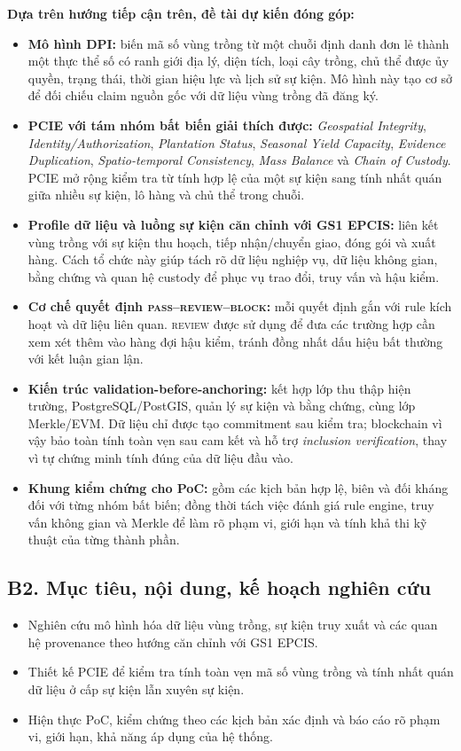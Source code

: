\documentclass[letterpaper,11pt]{article}
\begin{document}
\textbf{Dựa trên hướng tiếp cận trên, đề tài dự kiến đóng góp:}
\begin{itemize}
  \item \textbf{Mô hình DPI:} biến mã số vùng trồng từ một chuỗi định danh đơn lẻ thành một thực thể số có ranh giới địa lý, diện tích, loại cây trồng, chủ thể được ủy quyền, trạng thái, thời gian hiệu lực và lịch sử sự kiện. Mô hình này tạo cơ sở để đối chiếu claim nguồn gốc với dữ liệu vùng trồng đã đăng ký.
  \item \textbf{PCIE với tám nhóm bất biến giải thích được:} \textit{Geospatial Integrity}, \textit{Identity/Authorization}, \textit{Plantation Status}, \textit{Seasonal Yield Capacity}, \textit{Evidence Duplication}, \textit{Spatio-temporal Consistency}, \textit{Mass Balance} và \textit{Chain of Custody}. PCIE mở rộng kiểm tra từ tính hợp lệ của một sự kiện sang tính nhất quán giữa nhiều sự kiện, lô hàng và chủ thể trong chuỗi.
  \item \textbf{Profile dữ liệu và luồng sự kiện căn chỉnh với GS1 EPCIS:} liên kết vùng trồng với sự kiện thu hoạch, tiếp nhận/chuyển giao, đóng gói và xuất hàng. Cách tổ chức này giúp tách rõ dữ liệu nghiệp vụ, dữ liệu không gian, bằng chứng và quan hệ custody để phục vụ trao đổi, truy vấn và hậu kiểm.
  \item \textbf{Cơ chế quyết định \textsc{pass}--\textsc{review}--\textsc{block}:} mỗi quyết định gắn với rule kích hoạt và dữ liệu liên quan. \textsc{review} được sử dụng để đưa các trường hợp cần xem xét thêm vào hàng đợi hậu kiểm, tránh đồng nhất dấu hiệu bất thường với kết luận gian lận.
  \item \textbf{Kiến trúc validation-before-anchoring:} kết hợp lớp thu thập hiện trường, PostgreSQL/PostGIS, quản lý sự kiện và bằng chứng, cùng lớp Merkle/EVM. Dữ liệu chỉ được tạo commitment sau kiểm tra; blockchain vì vậy bảo toàn tính toàn vẹn sau cam kết và hỗ trợ \textit{inclusion verification}, thay vì tự chứng minh tính đúng của dữ liệu đầu vào.
  \item \textbf{Khung kiểm chứng cho PoC:} gồm các kịch bản hợp lệ, biên và đối kháng đối với từng nhóm bất biến; đồng thời tách việc đánh giá rule engine, truy vấn không gian và Merkle để làm rõ phạm vi, giới hạn và tính khả thi kỹ thuật của từng thành phần.
\end{itemize}

\subsection*{B2. Mục tiêu, nội dung, kế hoạch nghiên cứu}
\begin{itemize}
  \item Nghiên cứu mô hình hóa dữ liệu vùng trồng, sự kiện truy xuất và các quan hệ provenance theo hướng căn chỉnh với GS1 EPCIS.
  \item Thiết kế PCIE để kiểm tra tính toàn vẹn mã số vùng trồng và tính nhất quán dữ liệu ở cấp sự kiện lẫn xuyên sự kiện.
  \item Hiện thực PoC, kiểm chứng theo các kịch bản xác định và báo cáo rõ phạm vi, giới hạn, khả năng áp dụng của hệ thống.
\end{itemize}
\end{document}
